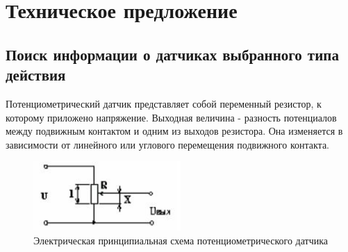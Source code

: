 \section{Техническое предложение}
\subsection{Поиск информации о датчиках выбранного типа действия}

Потенциометрический датчик представляет собой переменный резистор, к которому приложено напряжение.
Выходная величина - разность потенциалов между подвижным контактом и одним из выходов резистора.
Она изменяется в зависимости от линейного или углового перемещения подвижного контакта.

\begin{figure}[!h]
    \centering
    \includegraphics[width=0.5\textwidth]{img/img_1}
    \caption{Электрическая принципиальная схема потенциометрического датчика}
    \label{fig:img_1}
\end{figure}

